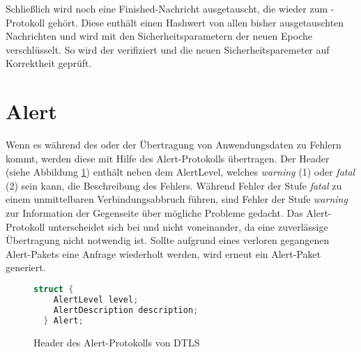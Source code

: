 Schließlich wird noch eine Finished-Nachricht ausgetauscht, die wieder zum -Protokoll gehört. Diese enthält einen Hashwert von allen bisher ausgetauschten
Nachrichten und wird mit den Sicherheitsparametern der neuen Epoche verschlüsselt. So wird der  verifiziert und die neuen Sicherheitsparemeter auf Korrektheit
geprüft.


\section{Alert}

Wenn es während des  oder der Übertragung von Anwendungsdaten zu Fehlern kommt, werden diese mit Hilfe des Alert-Protokolls übertragen.
Der Header (siehe Abbildung \ref{fig:alertlayer}) enthält neben dem AlertLevel, welches \textit{warning} (1) oder \textit{fatal} (2) sein kann,
die Beschreibung des Fehlers. Während Fehler der Stufe \textit{fatal} zu einem unmittelbaren Verbindungsabbruch führen, sind Fehler der Stufe
\textit{warning} zur Information der Gegenseite über mögliche Probleme gedacht. Das Alert-Protokoll unterscheidet sich bei  und 
nicht voneinander, da eine zuverlässige Übertragung nicht notwendig ist. Sollte aufgrund eines verloren gegangenen Alert-Pakets eine Anfrage
wiederholt werden, wird erneut ein Alert-Paket generiert. 

\begin{figure}[ht]
  \centering
  \begin{lstlisting}[language=c]
  struct {
    AlertLevel level;
    AlertDescription description;
  } Alert;
  \end{lstlisting}
  \caption{Header des Alert-Protokolls von DTLS}
  \label{fig:alertlayer}
\end{figure}